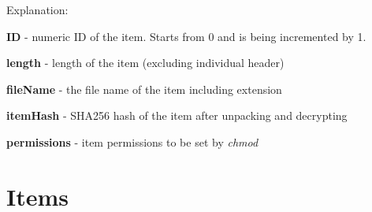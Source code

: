 Explanation:

\textbf{ID} - numeric ID of the item. Starts from 0 and is being incremented by 1.

\textbf{length} - length of the item (excluding individual header)

\textbf{fileName} - the file name of the item including extension 

\textbf{itemHash} - SHA256 hash of the item after unpacking and decrypting

\textbf{permissions} - item permissions to be set by \emph{chmod}

\section{Items}
